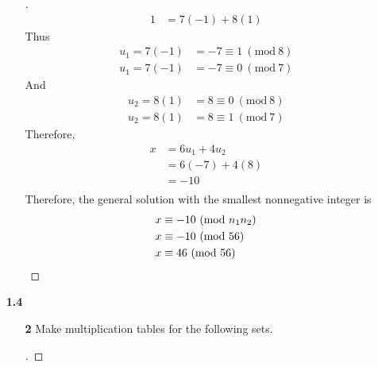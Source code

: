 \documentclass[paper=usletter, fontsize=12pt]{article}
\newcommand{\Mod}[1]{\ (\mathrm{mod}\ #1)}
\begin{document}
\begin{itemize}
\begin{itemize}
\begin{proof}[\unskip\nopunct]
\begin{align*}
                    1 & = 7(-1) + 8(1)
                \end{align*}
                Thus
                \begin{align*}
                    u_1 = 7(-1) & = -7 \equiv 1 \Mod{8}\\
                    u_1 = 7(-1) & = -7 \equiv 0 \Mod{7}
                \end{align*}
                And
                \begin{align*}
                    u_2 = 8(1) & = 8 \equiv 0 \Mod{8}\\
                    u_2 = 8(1) & = 8 \equiv 1 \Mod{7}
                \end{align*}
                Therefore,
                \begin{align*}
                    x & = 6u_1 + 4u_2\\
                    & = 6(-7) + 4(8)\\
                    & = -10\\
                \end{align*}
                Therefore, the general solution with the smallest nonnegative integer is
                \begin{align*}
                    x & \equiv -10 \Mod{n_1n_2} \\
                    x & \equiv -10 \Mod{56} \\
                    x & \equiv 46 \Mod{56} \qedhere
                \end{align*}
            \end{proof}

        \end{itemize}

        \item[\textbf{1.4}]

        \begin{itemize}

            \item[\textbf{2}] Make multiplication tables for the following
            sets.

            \begin{proof}[\unskip\nopunct]


\end{proof}
\end{itemize}
\end{itemize}
\end{document}
